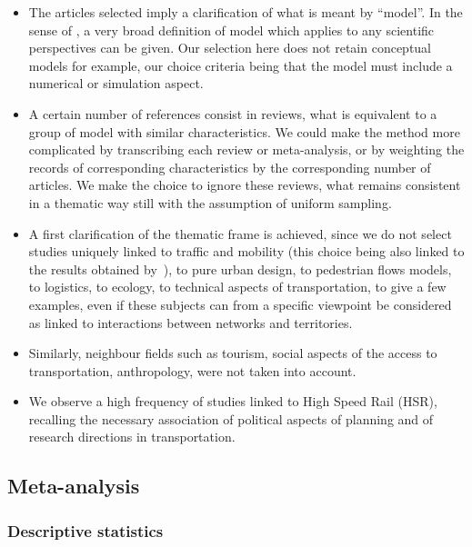 \documentclass[10pt]{article}
\begin{document}
\begin{itemize}
	\item The articles selected imply a clarification of what is meant by ``model''. In the sense of \cite{raimbault2017applied}, a very broad definition of model which applies to any scientific perspectives can be given. Our selection here does not retain conceptual models for example, our choice criteria being that the model must include a numerical or simulation aspect.
	\item A certain number of references consist in reviews, what is equivalent to a group of model with similar characteristics. %
	We could make the method more complicated by transcribing each review or meta-analysis, or by weighting the records of corresponding characteristics by the corresponding number of articles. We make the choice to ignore these reviews, what remains consistent in a thematic way still with the assumption of uniform sampling.
	\item A first clarification of the thematic frame is achieved, since we do not select studies uniquely linked to traffic and mobility (this choice being also linked to the results obtained by~\cite{raimbault2017investigating}), to pure urban design, to pedestrian flows models, to logistics, to ecology, to technical aspects of transportation, to give a few examples, even if these subjects can from a specific viewpoint be considered as linked to interactions between networks and territories.
	\item Similarly, neighbour fields such as tourism, social aspects of the access to transportation, anthropology, were not taken into account.
	\item We observe a high frequency of studies linked to High Speed Rail (HSR), recalling the necessary association of political aspects of planning and of research directions in transportation.
\end{itemize}



\subsection{Meta-analysis}

\subsubsection{Descriptive statistics}
\end{document}
